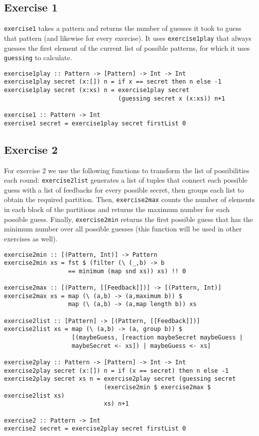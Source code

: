 \documentclass[a4paper,12pt]{amsart}
\begin{document}
\subsection*{Exercise 1}
\texttt{exercise1} takes a pattern and returns the number of guesses it took to guess that pattern (and likewise for every exercise). It uses \texttt{exercise1play} that always guesses the first element of the current list of possible patterns, for which it uses \texttt{guessing} to calculate.
\begin{verbatim}
exercise1play :: Pattern -> [Pattern] -> Int -> Int
exercise1play secret (x:[]) n = if x == secret then n else -1
exercise1play secret (x:xs) n = exercise1play secret
                                (guessing secret x (x:xs)) n+1

exercise1 :: Pattern -> Int
exercise1 secret = exercise1play secret firstList 0
\end{verbatim}

\subsection*{Exercise 2}
For exercise 2 we use the following functions to transform the list of possibilities each round: \texttt{exercise2list} generates a list of tuples that connect each possible guess with a list of feedbacks for every possible secret, then groups each list to obtain the required partition. Then, \texttt{exercise2max} counts the number of elements in each block of the partitions and returns the maximum number for each possible guess. Finally, \texttt{exercise2min} returns the first possible guess that has the minimum number over all possible guesses (this function will be used in other exercises as well).
\begin{verbatim}
exercise2min :: [(Pattern, Int)] -> Pattern
exercise2min xs = fst $ (filter (\ (_,b) -> b
                  == minimum (map snd xs)) xs) !! 0

exercise2max :: [(Pattern, [[Feedback]])] -> [(Pattern, Int)]
exercise2max xs = map (\ (a,b) -> (a,maximum b)) $
                  map (\ (a,b) -> (a,map length b)) xs

exercise2list :: [Pattern] -> [(Pattern, [[Feedback]])]
exercise2list xs = map (\ (a,b) -> (a, group b)) $
                   [(maybeGuess, [reaction maybeSecret maybeGuess |
                   maybeSecret <- xs]) | maybeGuess <- xs]

exercise2play :: Pattern -> [Pattern] -> Int -> Int
exercise2play secret (x:[]) n = if (x == secret) then n else -1
exercise2play secret xs n = exercise2play secret (guessing secret
                            (exercise2min $ exercise2max $ exercise2list xs)
                            xs) n+1

exercise2 :: Pattern -> Int
exercise2 secret = exercise2play secret firstList 0
\end{verbatim}
\end{document}
